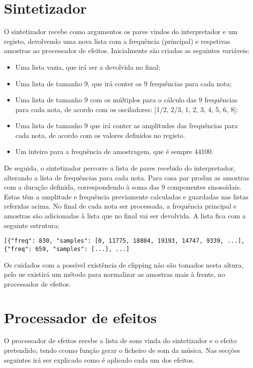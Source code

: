 \section{Sintetizador}
O sintetizador recebe como argumentos os pares vindos do interpretador e um registo, devolvendo uma nova lista com a frequência (principal) e respetivas amostras ao processador de efeitos. Inicialmente são criadas as seguintes variáveis:

\begin{itemize}
\item Uma lista vazia, que irá ser a devolvida no final;
\item Uma lista de tamanho 9, que irá conter os 9 frequências para cada nota;
\item Uma lista de tamanho 9 com os múltiplos para o cálculo das 9 frequências para cada nota, de acordo com os osciladores: [1/2, 2/3, 1, 2, 3, 4, 5, 6, 8];
\item Uma lista de tamanho 9 que irá conter as amplitudes das frequências para cada nota, de acordo com os valores definidos no registo.
\item Um inteiro para a frequência de amostragem, que é sempre 44100.
\end{itemize}

De seguida, o sintetizador percorre a lista de pares recebido do interpretador, alterando a lista de frequências para cada nota. Para casa par produz as amostras com a duração definida, correspondendo à soma das 9 componentes sinosoidais. Estas têm a amplitude e frequência previamente calculadas e guardadas nas listas referidas acima. No final de cada nota ser processada, a frequência principal e amostras são adicionadas à lista que no final vai ser devolvida. A lista fica com a seguinte estrutura:

\vspace{5mm}
\begin{lstlisting}
[{"freq": 830, "samples": [0, 11775, 18804, 19193, 14747, 9339, ...], {"freq": 659, "samples": [...], ...]
\end{lstlisting}
\vspace{5mm}

Os cuidados com a possível existência de clipping não são tomados nesta altura, pelo ue existirá um método para normalizar as amostras mais à frente, no processador de efeitos.

\section{Processador de efeitos}
O processador de efeitos recebe a lista de sons vinda do sintetizador e o efeito pretendido, tendo ccomo função gerar o ficheiro de som da música. Nas secções seguintes irá ser explicado como é aplicado cada um dos efeitos.

